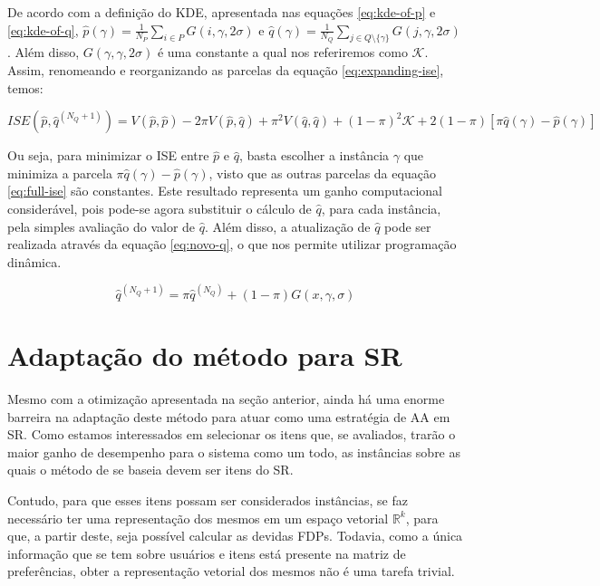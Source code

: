 De acordo com a definição do KDE, apresentada nas equações \ref{eq:kde-of-p} e \ref{eq:kde-of-q}, $\hat{p}(\gamma) = \frac{1}{N_P} \sum_{i \in P} G(i, \gamma, 2\sigma)$ e $\hat{q}(\gamma) = \frac{1}{N_Q} \sum_{j \in Q \setminus \{ \gamma \} } G(j, \gamma, 2\sigma)$. Além disso, $G(\gamma, \gamma, 2\sigma)$ é uma constante a qual nos referiremos como $\mathcal{K}$. Assim, renomeando e reorganizando as parcelas da equação \ref{eq:expanding-ise}, temos:

\begin{equation}
ISE(\hat{p}, \hat{q}^{(N_{Q}+1)}) = V(\hat{p}, \hat{p}) - 2\pi V(\hat{p}, \hat{q}) + \pi^{2}V(\hat{q}, \hat{q}) + (1 - \pi)^2 \mathcal{K} + 2(1 - \pi)\left[\pi \hat{q}(\gamma) - \hat{p}(\gamma)\right]
\label{eq:full-ise}
\end{equation}

Ou seja, para minimizar o ISE entre $\hat{p}$ e $\hat{q}$, basta escolher a instância $\gamma$ que minimiza a parcela $\pi \hat{q}(\gamma) - \hat{p}(\gamma)$, visto que as outras parcelas da equação \ref{eq:full-ise} são constantes. Este resultado representa um ganho computacional considerável, pois pode-se agora substituir o cálculo de $\hat{q}$, para cada instância, pela simples avaliação do valor de $\hat{q}$. Além disso, a atualização de $\hat{q}$ pode ser realizada através da equação \ref{eq:novo-q}, o que nos permite utilizar programação dinâmica.

\begin{equation}
\hat{q}^{(N_{Q}+1)} = \pi \hat{q}^{(N_{Q})} + (1 - \pi)G(x, \gamma, \sigma)
\label{eq:novo-q}
\end{equation}

\section{Adaptação do método para SR}
Mesmo com a otimização apresentada na seção anterior, ainda há uma enorme barreira na adaptação deste método para atuar como uma estratégia de AA em SR. Como estamos interessados em selecionar os itens que, se avaliados, trarão o maior ganho de desempenho para o sistema como um todo, as instâncias sobre as quais o método de \citep{cadu:2013} se baseia devem ser itens do SR.

Contudo, para que esses itens possam ser considerados instâncias, se faz necessário ter uma representação dos mesmos em um espaço vetorial $\mathbb{R}^k$, para que, a partir deste, seja possível calcular as devidas FDPs. Todavia, como a única informação que se tem sobre usuários e itens está presente na matriz de preferências, obter a representação vetorial dos mesmos não é uma tarefa trivial.

